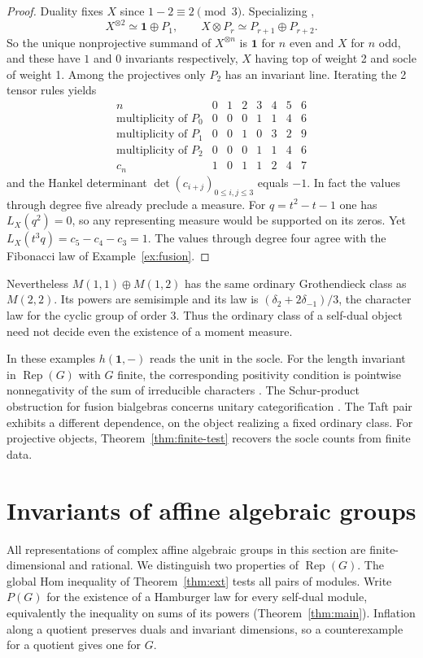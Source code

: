 \documentclass[11pt,reqno]{amsart}
\theoremstyle{definition}
\newcommand{\one}{\mathbf 1}
\newcommand{\Rep}{\operatorname{Rep}}
\begin{document}
\begin{proof}
Duality fixes $X$ since $1-2\equiv2\pmod3$. Specializing \cite[Propositions~3.2 and~3.4]{CVZ},
\[
 X^{\otimes2}\simeq\one\oplus P_1,\qquad
 X\otimes P_r\simeq P_{r+1}\oplus P_{r+2}.
\]
So the unique nonprojective summand of $X^{\otimes n}$ is $\one$ for $n$ even and $X$ for $n$ odd, and these have $1$ and $0$ invariants respectively, $X$ having top of weight 2 and socle of weight 1. Among the projectives only $P_2$ has an invariant line. Iterating the 2 tensor rules yields
\[
\begin{array}{c|rrrrrrr}
 n                         &0&1&2&3&4&5&6\\ \hline
 \text{multiplicity of }P_0&0&0&0&1&1&4&6\\
 \text{multiplicity of }P_1&0&0&1&0&3&2&9\\
 \text{multiplicity of }P_2&0&0&0&1&1&4&6\\ \hline
 c_n                       &1&0&1&1&2&4&7
\end{array}
\]
and the Hankel determinant $\det(c_{i+j})_{0\leq i,j\leq3}$ equals $-1$. In fact the values through degree five already preclude a measure. For $q=t^2-t-1$ one has $L_X(q^2)=0$, so any representing measure would be supported on its zeros. Yet $L_X(t^3q)=c_5-c_4-c_3=1$. The values through degree four agree with the Fibonacci law of Example~\ref{ex:fusion}.
\end{proof}

Nevertheless $M(1,1)\oplus M(1,2)$ has the same ordinary Grothendieck
class as $M(2,2)$. Its powers are semisimple and its law is
$(\delta_2+2\delta_{-1})/3$, the character law for the cyclic group of
order 3. Thus the ordinary class of a self-dual object need not
decide even the existence of a moment measure.

In these examples $h(\one,-)$ reads the unit in the socle. For the length invariant in $\Rep(G)$ with $G$ finite, the corresponding positivity condition is pointwise nonnegativity of the sum of irreducible characters \cite[Remark~2.7(1)]{FFK}. The Schur-product obstruction for fusion bialgebras concerns unitary categorification \cite[Propositions~3.3, 8.3 and Corollary~8.5]{LPW}. The Taft pair exhibits a different dependence, on the object realizing a fixed ordinary class. For projective objects, Theorem~\ref{thm:finite-test} recovers the socle counts from finite data.

\section{Invariants of affine algebraic groups}\label{sec:groups}
All representations of complex affine algebraic groups in this section are finite-dimensional and rational. We distinguish two properties of $\Rep(G)$. The global Hom inequality of Theorem~\ref{thm:ext} tests all pairs of modules. Write $P(G)$ for the existence of a Hamburger law for every self-dual module, equivalently the inequality on sums of its powers (Theorem~\ref{thm:main}). Inflation along a quotient preserves duals and invariant dimensions, so a counterexample for a quotient gives one for $G$.
\end{document}
